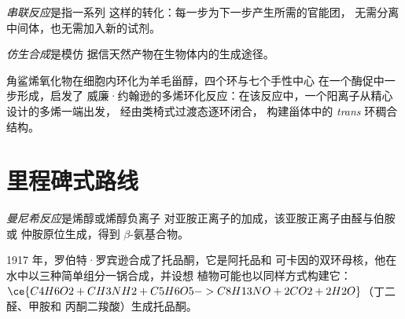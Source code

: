 \begin{definition}[串联反应]\label{def:b3:total-synthesis:cascade}
\emph{串联反应}是指一系列
这样的转化：每一步为下一步产生所需的官能团，
无需分离中间体，也无需加入新的试剂。
\end{definition}

\begin{definition}[仿生合成]\label{def:b3:total-synthesis:biomimetic}
\emph{仿生合成}是模仿
据信天然产物在生物体内的生成途径。
\end{definition}

角鲨烯氧化物在细胞内环化为羊毛甾醇，四个环与七个手性中心
在一个酶促中一步形成，启发了
威廉·约翰逊的多烯环化反应：在该反应中，一个阳离子从精心设计的多烯一端出发，
经由类椅式过渡态逐环闭合，
构建甾体中的 \textit{trans} 环稠合结构。

\section{里程碑式路线}

\begin{definition}[曼尼希反应]\label{def:b3:total-synthesis:mannich}
\emph{曼尼希反应}是烯醇或烯醇负离子
对亚胺正离子的加成，该亚胺正离子由醛与伯胺或
仲胺原位生成，得到 $\beta$-氨基合物。
\end{definition}

1917 年，罗伯特·罗宾逊合成了托品酮，它是阿托品和
可卡因的双环母核，他在水中以三种简单组分一锅合成，并设想
植物可能也以同样方式构建它：
$\ce{C4H6O2 + CH3NH2 + C5H6O5 -> C8H13NO + 2CO2 + 2H2O}$（丁二醛、甲胺和
丙酮二羧酸）生成托品酮。

